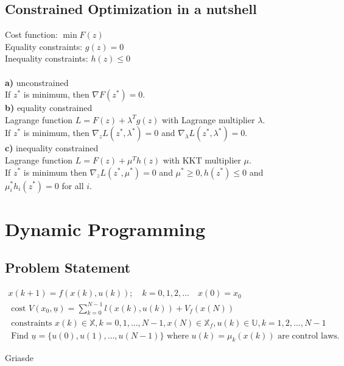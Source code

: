 \documentclass[english]{latex4ei/latex4ei_sheet}
\begin{document}
\begin{sectionbox}
\subsection{Constrained Optimization in a nutshell}
Cost function: $\min F(z)$\\
Equality constraints: $g(z)=0$\\
Inequality constraints: $h(z)\leq 0$\\
\\
\textbf{a)} unconstrained\\
If $z^*$ is minimum, then $\nabla F(z^*)=0$.\\
\textbf{b)} equality constrained\\
Lagrange function $L=F(z)+\lambda^{T} g(z)$ with Lagrange multiplier $\lambda$. \\ 
If $z^{*}$ is minimum, then $\nabla_{z} L\left(z^{*}, \lambda^{*}\right)=0$ and $\nabla_{\lambda} L\left(z^{*}, \lambda^{*}\right)=0$. \\
\textbf{c)} inequality constrained\\
Lagrange function $L=F(z)+\mu^{T} h(z)$ with KKT multiplier $\mu$. \\
If $z^{*}$ is minimum then $\nabla_{z} L\left(z^{*}, \mu^{*}\right)=0$ and $\mu^{*} \geq 0, h\left(z^{*}\right) \leq 0$ and $\mu_{i}^{*} h_{i}\left(z^{*}\right)=0$ for all $i$.

\section{Dynamic Programming}

\subsection{Problem Statement}
$$
\begin{array}{l}{x(k+1)=f(x(k), u(k)) ; \quad k=0,1,2, \ldots \quad x(0)=x_{0}} \\ {\text { cost } V\left(x_{0}, \underline{u}\right)=\sum_{k=0}^{N-1} l(x(k), u(k))+V_{f}(x(N))} \\ {\text { constraints } x(k) \in \mathbb{X}, k=0,1, \ldots, N-1, x(N) \in \mathbb{X}_{f}, u(k) \in \mathbb{U}, k=1,2, \ldots, N-1} \\ {\text { Find } \underline{u}=\{u(0), u(1), \ldots, u(N-1)\} \text { where } u(k)=\mu_{k}(x(k)) \text { are control laws. }}\end{array}
$$
\begin{emphbox}
    Griasde
\end{emphbox}


\end{sectionbox}
\end{document}
